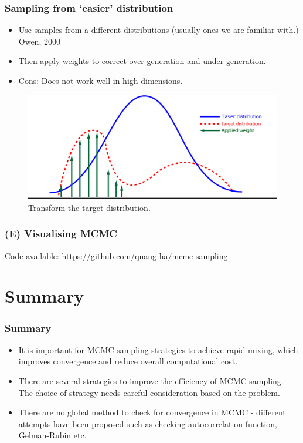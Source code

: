 \documentclass[10pt]{beamer}
\begin{document}
\begin{frame}
	\frametitle{Sampling from `easier' distribution}
	\begin{itemize}
		\item Use samples from a different distributions (usually ones we are familiar with.) \tiny{Owen, 2000} \normalsize
		\item Then apply weights to correct over-generation and under-generation.
		\item Cons: Does not work well in high dimensions.
	\end{itemize}
	\begin{figure}[h]
		\centering
		\includegraphics[width=\textwidth]{importance-sampling}
		\caption{Transform the target distribution.}
	\end{figure}	
\end{frame}

\begin{frame}
	\frametitle{(E) Visualising MCMC}
	Code available: \url{https://github.com/quang-ha/mcmc-sampling}
	\centering
\end{frame}

\section{Summary}
\begin{frame}[plain]
	\frametitle{Summary}
	\begin{itemize}
		\item It is important for MCMC sampling strategies to achieve rapid mixing, which improves convergence and reduce overall computational cost.
		\item There are several strategies to improve the efficiency of MCMC sampling. The choice of strategy needs careful consideration based on the problem.
		\item There are no global method to check for convergence in MCMC - different attempts have been proposed such as checking autocorrelation function, Gelman-Rubin etc.
	\end{itemize}
\end{frame}
	
\end{document}
